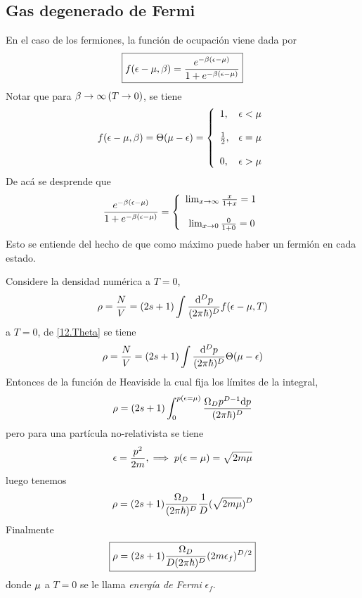 \subsection{Gas degenerado de Fermi}
En el caso de los fermiones, la función de ocupación viene dada por
\begin{equation}
  \boxed{f(\epsilon-\mu,\beta )=\frac{e^{-\beta(\epsilon-\mu  )}}{1+e^{-\beta(\epsilon-\mu)}}}
\end{equation}
Notar que para $\beta\to \infty \,(T\to 0)$, se tiene
\begin{equation}\label{12.Theta}
  f(\epsilon-\mu ,\beta )=\Theta (\mu-\epsilon )= \left\{ \begin{array}{lcc} 1,& \epsilon<\mu \\ \\ 
  \frac{1}{2},&\epsilon=\mu \\ \\  0,&\epsilon>\mu  \end{array}\right.
\end{equation}
De acá se desprende que
\begin{equation}
  \frac{e^{-\beta(\epsilon-\mu  )}}{1+e^{-\beta(\epsilon-\mu)}}= \left\{\begin{array}{lcc}
  	\lim_{x\to\infty}\frac{x}{1+x}=1\\ \\\
  	\lim_{x\to 0}\frac{0}{1+0}=0
  \end{array}   \right.
\end{equation}
Esto se entiende del hecho de que como máximo puede haber un fermión en cada estado.

Considere la densidad numérica a $T=0$,
\begin{equation}
  \rho=\frac{N}{V}=(2s+1)\int \frac{\dd^Dp}{(2\pi \hbar)^D}f(\epsilon-\mu ,T)
\end{equation}
a $T=0$, de \eqref{12.Theta} se tiene
\begin{equation}
  \rho=\frac{N}{V}=(2s+1)\int \frac{\dd^Dp}{(2\pi \hbar)^D} \Theta (\mu-\epsilon)
\end{equation}
Entonces de la función de Heaviside la cual fija los límites de la integral,
\begin{equation}
  \rho =(2s+1)\int_0^{p (\epsilon=\mu )}\frac{\Omega_D p^{D-1}\dd p}{(2\pi\hbar)^D}
\end{equation}
pero para una partícula no-relativista se tiene
\begin{equation}
  \epsilon=\frac{p^2}{2m},\implies  p(\epsilon=\mu )=\sqrt{2m\mu }
\end{equation}
luego tenemos
\begin{equation}
  \rho =(2s+1)\frac{\Omega_D}{(2\pi\hbar)^D}\frac{1}{D}(\sqrt{2m\mu })^D
\end{equation}
Finalmente
\begin{equation}
 \boxed{ \rho=(2s+1)\frac{\Omega_D}{D(2\pi\hbar)^D}(2m\epsilon_f)^{D/2}}
\end{equation}
donde $\mu$ a $T=0$ se le llama \textit{energía de Fermi} $\epsilon_f$.

